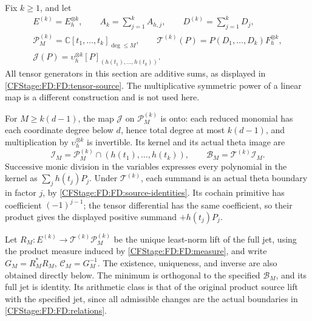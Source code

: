 Fix \(k\ge1\), and let
\begin{equation}
\begin{gathered}
E^{(k)}=E_h^{\otimes k},\qquad
A_k=\sum_{j=1}^k A_{h,j},\qquad D^{(k)}=\sum_{j=1}^kD_j,\\
\mathcal P_M^{(k)}=\mathbb C[t_1,\ldots,t_k]_{\deg\le M},\qquad
\mathcal T^{(k)}(P)=P(D_1,\ldots,D_k)F_h^{\otimes k},\\
\mathcal J(P)=\upsilon_h^{\otimes k}
[P]_{(h(t_1),\ldots,h(t_k))}.
\end{gathered}
\tag{FD.6}\label{CFStage:FD:FD:tensor-source}
\end{equation}
All tensor generators in this section are additive sums, as displayed in
\eqref{CFStage:FD:FD:tensor-source}.  The multiplicative symmetric power of a linear
map is a different construction and is not used here.

For \(M\ge k(d-1)\), the map \(\mathcal J\) on
\(\mathcal P_M^{(k)}\) is onto: each reduced monomial has each coordinate
degree below \(d\), hence total degree at most \(k(d-1)\), and multiplication
by \(\upsilon_h^{\otimes k}\) is invertible.  Its kernel and its actual
theta image are
\begin{equation}
\mathcal I_M=\mathcal P_M^{(k)}\cap(h(t_1),\ldots,h(t_k)),\qquad
\mathcal B_M=\mathcal T^{(k)}\mathcal I_M.
\tag{FD.7}\label{CFStage:FD:FD:relations}
\end{equation}
Successive monic division in the variables expresses every polynomial in
the kernel as \(\sum_jh(t_j)P_j\).  Under \(\mathcal T^{(k)}\), each
summand is an actual theta boundary in factor \(j\), by
\eqref{CFStage:FD:FD:source-identities}.  Its cochain primitive has coefficient
\((-1)^{j-1}\); the tensor differential has the same coefficient, so their
product gives the displayed positive summand \(+h(t_j)P_j\).

Let \(R_M:E^{(k)}\to\mathcal T^{(k)}\mathcal P_M^{(k)}\) be the unique
least-norm lift of the full jet, using the product measure induced by
\eqref{CFStage:FD:FD:measure}, and write
\(G_M=R_M^*R_M\), \(\mathcal C_M=G_M^{-1}\).
The existence, uniqueness, and inverse are also obtained directly below.
The minimum is orthogonal to the specified \(\mathcal B_M\), and its
full jet is identity.  Its arithmetic class is that of the original
product source lift with the specified jet, since all admissible
changes are the actual boundaries in \eqref{CFStage:FD:FD:relations}.

